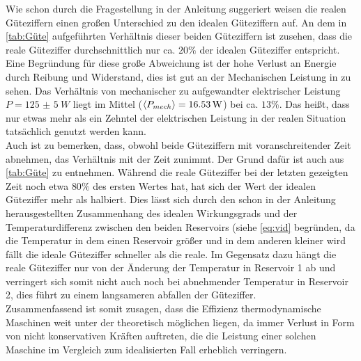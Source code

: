 Wie schon durch die Fragestellung in der Anleitung suggeriert weisen die realen 
Güteziffern einen großen Unterschied zu den idealen Güteziffern auf.
An dem in \autoref{tab:Güte} aufgeführten Verhältnis dieser beiden Güteziffern
ist zusehen, dass die reale Güteziffer durchschnittlich nur ca. $20\%$ der idealen Güteziffer
entspricht.
Eine Begründung für diese große Abweichung ist der hohe Verlust an Energie durch Reibung und Widerstand,
dies ist gut an der Mechanischen Leistung in  zu sehen. Das Verhältnis von mechanischer
zu aufgewandter elektrischer Leistung $P = \SI{125(5)}{W} $ liegt im Mittel ($\langle P_{mech}\rangle = \SI{16,53}{W}$)
bei ca. $13\%$. Das heißt, dass nur etwas mehr als ein Zehntel der elektrischen Leistung 
in der realen Situation tatsächlich genutzt werden kann.\\

Auch ist zu bemerken, dass, obwohl beide Güteziffern mit voranschreitender Zeit abnehmen, das Verhältnis
mit der Zeit zunimmt. Der Grund dafür ist auch aus \autoref{tab:Güte} zu entnehmen. Während die reale 
Güteziffer bei der letzten gezeigten Zeit noch etwa $80\%$ des ersten Wertes hat, hat sich der Wert der 
idealen Güteziffer mehr als halbiert. Dies lässt sich durch den schon in der Anleitung herausgestellten 
Zusammenhang des idealen Wirkungsgrads und der Temperaturdifferenz zwischen den beiden Reservoirs (siehe \eqref{eq:vid} begründen,
da die Temperatur in  dem einen Reservoir größer und in dem anderen kleiner wird fällt die ideale Güteziffer schneller als die reale.
Im Gegensatz dazu hängt die reale Güteziffer nur von der Änderung der Temperatur in Reservoir 1 
ab und verringert sich somit nicht auch noch bei abnehmender Temperatur in Reservoir 2, dies führt zu einem langsameren abfallen der Güteziffer.\\

Zusammenfassend ist somit zusagen, dass die Effizienz thermodynamische Maschinen weit unter der theoretisch möglichen liegen,
da immer Verlust in Form von nicht konservativen Kräften auftreten, die die Leistung einer solchen Maschine im Vergleich zum idealisierten Fall
erheblich verringern.     
   
 
 
